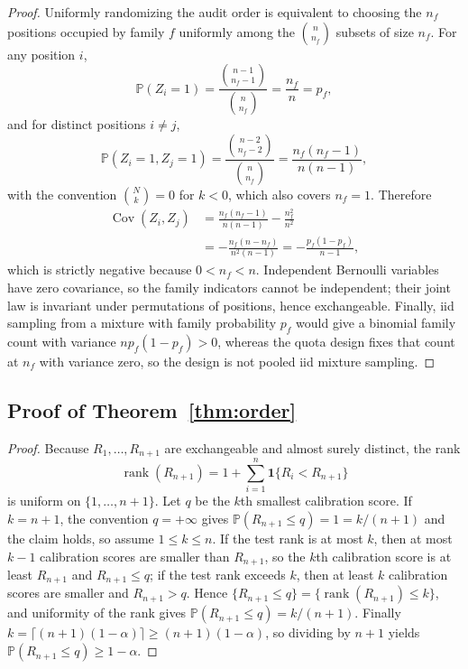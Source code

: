 \documentclass[aps,prx,reprint,superscriptaddress,floatfix]{revtex4-2}
\newcommand{\Pp}{\mathbb{P}}
\begin{document}
\begin{proof}
Uniformly randomizing the audit order is equivalent to choosing the $n_f$
positions occupied by family $f$ uniformly among the $\binom{n}{n_f}$ subsets of
size $n_f$.  For any position $i$,
\[
 \Pp(Z_i=1)=\frac{\binom{n-1}{n_f-1}}{\binom{n}{n_f}}=\frac{n_f}{n}=p_f ,
\]
and for distinct positions $i\ne j$,
\[
 \Pp(Z_i=1,Z_j=1)=\frac{\binom{n-2}{n_f-2}}{\binom{n}{n_f}}
 =\frac{n_f(n_f-1)}{n(n-1)} ,
\]
with the convention $\binom{N}{k}=0$ for $k<0$, which also covers $n_f=1$.
Therefore
\begin{align*}
 \operatorname{Cov}(Z_i,Z_j)
 &=\frac{n_f(n_f-1)}{n(n-1)}-\frac{n_f^2}{n^2}\\
 &=-\frac{n_f(n-n_f)}{n^2(n-1)}
 =-\frac{p_f(1-p_f)}{n-1} ,
\end{align*}
which is strictly negative because $0<n_f<n$.  Independent Bernoulli variables
have zero covariance, so the family indicators cannot be independent; their joint
law is invariant under permutations of positions, hence exchangeable.  Finally,
iid sampling from a mixture with family probability $p_f$ would give a binomial
family count with variance $np_f(1-p_f)>0$, whereas the quota design fixes that
count at $n_f$ with variance zero, so the design is not pooled iid mixture
sampling.
\end{proof}

\subsection{Proof of Theorem~\ref{thm:order}}
\label{app:proof-order}

\begin{proof}
Because $R_1,\dots,R_{n+1}$ are exchangeable and almost surely distinct, the rank
\[
 \operatorname{rank}(R_{n+1})=1+\sum_{i=1}^{n}\mathbf 1\{R_i<R_{n+1}\}
\]
is uniform on $\{1,\dots,n+1\}$.  Let $q$ be the $k$th smallest calibration
score.  If $k=n+1$, the convention $q=+\infty$ gives
$\Pp(R_{n+1}\le q)=1=k/(n+1)$ and the claim holds, so assume $1\le k\le n$.  If
the test rank is at most $k$, then at most $k-1$ calibration scores are smaller
than $R_{n+1}$, so the $k$th calibration score is at least $R_{n+1}$ and
$R_{n+1}\le q$; if the test rank exceeds $k$, then at least $k$ calibration
scores are smaller and $R_{n+1}>q$.  Hence
$\{R_{n+1}\le q\}=\{\operatorname{rank}(R_{n+1})\le k\}$, and uniformity of the
rank gives $\Pp(R_{n+1}\le q)=k/(n+1)$.  Finally
$k=\lceil(n+1)(1-\alpha)\rceil\ge(n+1)(1-\alpha)$, so dividing by $n+1$ yields
$\Pp(R_{n+1}\le q)\ge1-\alpha$.
\end{proof}
\end{document}
